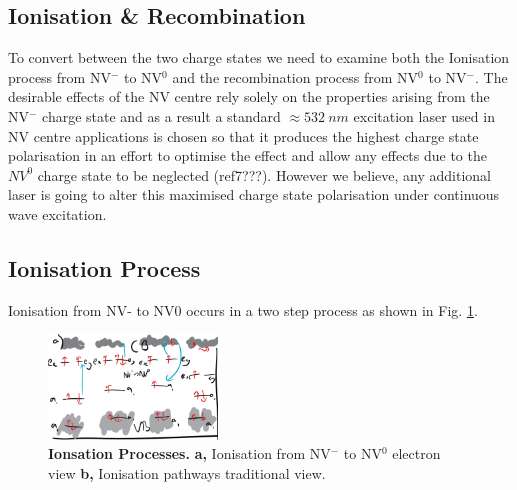 \documentclass[prl]{revtex4}
\begin{document}

\subsection{Ionisation \& Recombination}
To convert between the two charge states we need to examine both the Ionisation process from NV$^-$ to NV$^0$ and the recombination process from NV$^0$ to NV$^-$. The desirable effects of the NV centre rely solely on the properties arising from the NV$^-$ charge state and as a result a standard $\approx \SI{532}{nm}$ excitation laser used in NV centre applications is chosen so that it produces the highest charge state polarisation in an effort to optimise the effect and allow any effects due to the $NV^0$ charge state to be neglected (ref7???). However we believe, any additional laser is going to alter this maximised charge state polarisation under continuous wave excitation. 

\subsection{Ionisation Process}
Ionisation from NV- to NV0 occurs in a two step process as shown in Fig. \ref{FigChargeConversiona}.

\begin{figure}[H]
  \centering
  \includegraphics[width=0.4\textwidth]{ChargeConversiona.png} 
 \caption{\textbf{Ionsation Processes.} \textbf{a,} Ionisation from NV$^-$ to NV$^0$ electron view \textbf{b,} Ionisation pathways traditional view.} \label{FigChargeConversiona}
\end{figure}
\end{document}
